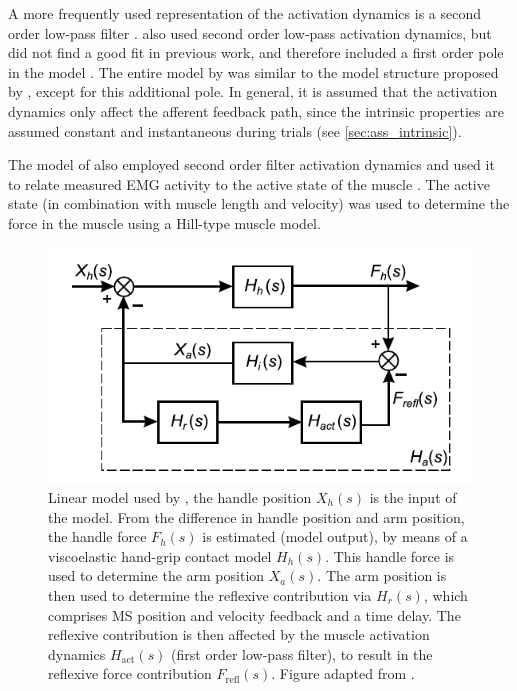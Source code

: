 A more frequently used representation of the activation dynamics is a second order low-pass filter \cite{schouten_nmclab_2008, mugge_rigorous_2010}. \citeauthor{mirbagheri_intrinsic_2000} also used second order low-pass activation dynamics, but did not find a good fit in previous work, and therefore included a first order pole in the model \cite{mirbagheri_intrinsic_2000, mirbagheri_parametric_1995}. The entire model by \citeauthor{mirbagheri_intrinsic_2000} was similar to the model structure proposed by \citeauthor{kearney_identification_1997}, except for this additional pole. In general, it is assumed that the activation dynamics only affect the afferent feedback path, since the intrinsic properties are assumed constant and instantaneous during trials (see \autoref{sec:ass_intrinsic}). 

The model of \citeauthor{de_gooijer-van_de_groep_estimation_2016} also employed second order filter activation dynamics and used it to relate measured EMG activity to the active state of the muscle \cite{de_gooijer-van_de_groep_estimation_2016}. The active state (in combination with muscle length and velocity) was used to determine the force in the muscle using a Hill-type muscle model. 


\begin{figure}[t]
    \centering
    \includegraphics[width=0.6\linewidth]{Figures/models_assumptions/model_helm_2002.pdf}
    \caption{Linear model used by \citeauthor{van_der_helm_identification_2002}, the handle position $X_h(s)$ is the input of the model. From the difference in handle position and arm position, the handle force $F_h(s)$ is estimated (model output), by means of a viscoelastic hand-grip contact model $H_h(s)$. This handle force is used to determine the arm position $X_a(s)$. The arm position is then used to determine the reflexive contribution via $H_r(s)$, which comprises MS position and velocity feedback and a time delay. The reflexive contribution is then affected by the muscle activation dynamics $H_\text{act}(s)$ (first order low-pass filter), to result in the reflexive force contribution $F_\text{refl}(s)$. Figure adapted from \citet{van_der_helm_identification_2002}.}
    \label{fig:model_helm_2002}
\end{figure}




